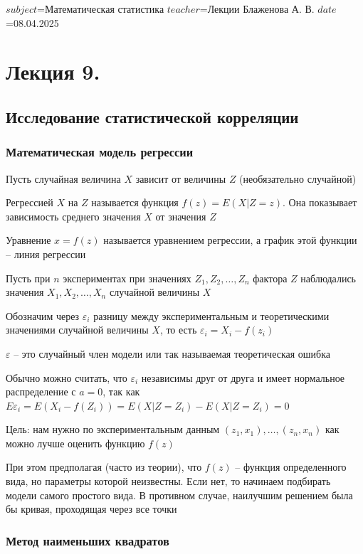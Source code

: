 $subject$=Математическая статистика
$teacher$=Лекции Блаженова А. В.
$date$=08.04.2025

\section{Лекция 9.}

\subsection{Исследование статистической корреляции}

\subsubsection{Математическая модель регрессии}

\hypertarget{regression}{}

Пусть случайная величина $X$ зависит от величины $Z$ (необязательно случайной)

\Def Регрессией $X$ на $Z$ называется функция $f(z) = E(X|Z = z)$. 
Она показывает зависимость среднего значения $X$ от значения $Z$

Уравнение $x = f(z)$ называется уравнением регрессии, а график этой функции -- линия регрессии

Пусть при $n$ экспериментах при значениях $Z_1, Z_2, \dots, Z_n$ фактора $Z$ наблюдались значения
$X_1, X_2, \dots, X_n$ случайной величины $X$

Обозначим через $\varepsilon_i$ разницу между экспериментальным и теоретическими значениями случайной величины $X$,
то есть $\varepsilon_i = X_i - f(z_i)$

$\varepsilon$ -- это случайный член модели или так называемая теоретическая ошибка

\Nota Обычно можно считать, что $\varepsilon_i$ независимы друг от друга и имеет нормальное распределение с $a = 0$,
так как $E\varepsilon_i = E(X_i - f(Z_i)) = E(X | Z = Z_i) - E(X | Z = Z_i) = 0$

Цель: нам нужно по экспериментальным данным $(z_1, x_1), \dots, (z_n, x_n)$ как можно лучше оценить функцию $f(z)$

\Notas При этом предполагая (часто из теории), что $f(z)$ -- функция определенного вида, но параметры которой неизвестны.
Если нет, то начинаем подбирать модели самого простого вида. В противном случае, наилучшим решением была бы кривая, 
проходящая через все точки 

\subsubsection{Метод наименьших квадратов}

